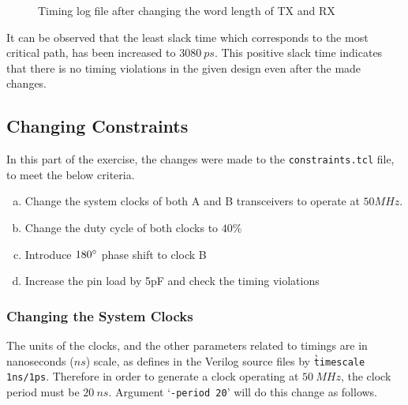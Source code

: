 \documentclass[a4paper,11pt]{article}%
\begin{document}
\begin{figure}[h]
	\centering
	\caption{Timing log file after changing the word length of TX and RX}
	\label{fig:timing_log2}
\end{figure}

It can be observed that the least slack time which corresponds to the most critical path, has been increased to $3080~ps$. This positive slack time indicates that there is no timing violations in the given design even after the made changes. 
\pagebreak
\subsection{Changing Constraints}

In this part of the exercise, the changes were made to the {\tt constraints.tcl} file, to meet the below criteria.

\begin{enumerate}[a.]
	\item Change the system clocks of both A and B transceivers to operate at $50MHz$.
	\item Change the duty cycle of both clocks to $40\%$
	\item Introduce $180\degree$ phase shift to clock B
	\item Increase the pin load by 5pF and check the timing violations
\end{enumerate}

\subsubsection{Changing the System Clocks}

The units of the clocks, and the other parameters related to timings are in nanoseconds ($ns$) scale, as defines in the Verilog source files by {\tt \`timescale 1ns/1ps}. Therefore in order to generate a clock operating at $50~MHz$, the clock period must be $20~ns$.  Argument `{\tt -period 20}' will do this change as follows.
\end{document}
